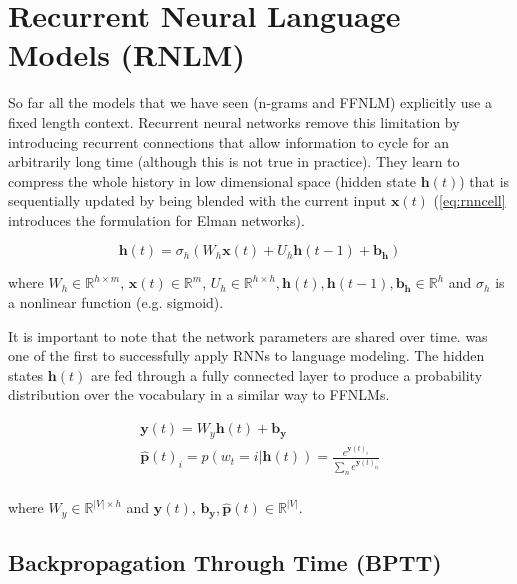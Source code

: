 \section{Recurrent Neural Language Models (RNLM)}
\label{sec:rnn}

So far all the models that we have seen (n-grams and FFNLM) explicitly use a fixed length context. Recurrent neural networks remove this limitation by introducing recurrent connections that allow information to cycle for an arbitrarily long time (although this is not true in practice). They learn to compress the whole history in low dimensional space (hidden state $\mathbf{h}(t)$) that is sequentially updated by being blended with the current input $\mathbf{x}(t)$ (\autoref{eq:rnncell} introduces the formulation for Elman networks).

\begin{equation} \label{eq:rnncell}
		\mathbf{h}(t) = \sigma_h(W_h \mathbf{x}(t) + U_h \mathbf{h}(t-1) + \mathbf{b_h})
\end{equation}

where $W_h \in \mathbb{R}^{h \times m}$, $\mathbf{x}(t) \in \mathbb{R}^{m}$, $U_h \in \mathbb{R}^{h \times h} , \mathbf{h}(t), \mathbf{h}(t-1), \mathbf{b_h} \in \mathbb{R}^{h}$ and $\sigma_h$ is a nonlinear function (e.g. sigmoid). 

It is important to note that the network parameters are shared over time. \cite{mikolov2010recurrent} was one of the first to successfully apply RNNs to language modeling. The hidden states $\mathbf{h}(t)$ are fed through a fully connected layer to produce a probability distribution over the vocabulary in a similar way to FFNLMs.

\begin{equation} \label{eq:rnnlm}
	\begin{gathered}
		\mathbf{y}(t) = W_y \mathbf{h}(t) + \mathbf{b_y} \\
		\mathbf{\hat{p}}(t)_i=\hat{p}(w_t=i|\mathbf{h}(t)) = \frac{e^{\mathbf{y}(t)_i}}{\sum_{n}e^{\mathbf{y}(t)_n}} \\
	\end{gathered}
\end{equation}

where $W_y \in \mathbb{R}^{|V| \times h}$ and $\mathbf{y}(t)$, $\mathbf{b_y}, \mathbf{\hat{p}}(t) \in \mathbb{R}^{|V|}$.

\subsection{Backpropagation Through Time (BPTT)}


